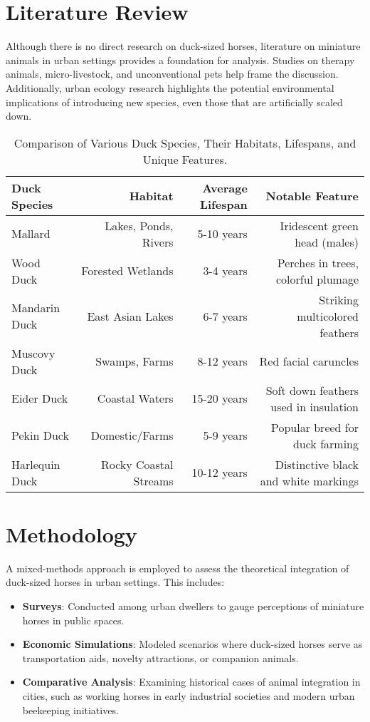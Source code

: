 \documentclass[12pt,a4paper]{report}
\begin{document}
\chapter{Literature Review}\label{sec:Literature_Review}

Although there is no direct research on duck-sized horses, literature on miniature animals in urban settings provides a foundation for analysis. Studies on therapy animals, micro-livestock, and unconventional pets help frame the discussion. Additionally, urban ecology research highlights the potential environmental implications of introducing new species, even those that are artificially scaled down.



\begin{table}[H]
\centering
\caption{Comparison of Various Duck Species, Their Habitats, Lifespans, and Unique Features.}
\begin{tabular}{lrrr}
\toprule
Duck Species & Habitat & Average Lifespan & Notable Feature \\
\midrule
Mallard & Lakes, Ponds, Rivers & 5-10 years & Iridescent green head (males) \\
Wood Duck & Forested Wetlands & 3-4 years & Perches in trees, colorful plumage \\
Mandarin Duck & East Asian Lakes & 6-7 years & Striking multicolored feathers \\
Muscovy Duck & Swamps, Farms & 8-12 years & Red facial caruncles \\
Eider Duck & Coastal Waters & 15-20 years & Soft down feathers used in insulation \\
Pekin Duck & Domestic/Farms & 5-9 years & Popular breed for duck farming \\
Harlequin Duck & Rocky Coastal Streams & 10-12 years & Distinctive black and white markings \\
\bottomrule
\end{tabular}
\end{table}


\chapter{Methodology}\label{sec:Methodology}

A mixed-methods approach is employed to assess the theoretical integration of duck-sized horses in urban settings. This includes:



\begin{itemize}
	\item \textbf{Surveys}: Conducted among urban dwellers to gauge perceptions of miniature horses in public spaces.
	\item \textbf{Economic Simulations}: Modeled scenarios where duck-sized horses serve as transportation aids, novelty attractions, or companion animals.
	\item \textbf{Comparative Analysis}: Examining historical cases of animal integration in cities, such as working horses in early industrial societies and modern urban beekeeping initiatives.
\end{itemize}
\end{document}
